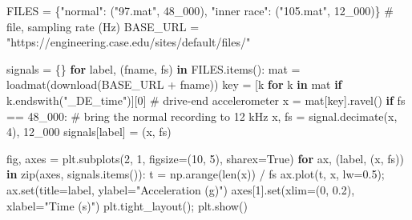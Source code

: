 \documentclass[
  letterpaper,
  DIV=11,
  numbers=noendperiod]{scrreprt}
\newenvironment{Shaded}{\begin{snugshade}}{\end{snugshade}}
\newcommand{\BuiltInTok}[1]{\textcolor[rgb]{0.00,0.23,0.31}{#1}}
\newcommand{\CommentTok}[1]{\textcolor[rgb]{0.37,0.37,0.37}{#1}}
\newcommand{\ControlFlowTok}[1]{\textcolor[rgb]{0.00,0.23,0.31}{\textbf{#1}}}
\newcommand{\DecValTok}[1]{\textcolor[rgb]{0.68,0.00,0.00}{#1}}
\newcommand{\FloatTok}[1]{\textcolor[rgb]{0.68,0.00,0.00}{#1}}
\newcommand{\KeywordTok}[1]{\textcolor[rgb]{0.00,0.23,0.31}{\textbf{#1}}}
\newcommand{\NormalTok}[1]{\textcolor[rgb]{0.00,0.23,0.31}{#1}}
\newcommand{\OperatorTok}[1]{\textcolor[rgb]{0.37,0.37,0.37}{#1}}
\newcommand{\StringTok}[1]{\textcolor[rgb]{0.13,0.47,0.30}{#1}}
\newcommand{\VariableTok}[1]{\textcolor[rgb]{0.07,0.07,0.07}{#1}}
\begin{document}
\begin{Shaded}
\begin{Highlighting}[]
\NormalTok{FILES }\OperatorTok{=}\NormalTok{ \{}\StringTok{"normal"}\NormalTok{: (}\StringTok{"97.mat"}\NormalTok{, }\DecValTok{48\_000}\NormalTok{), }\StringTok{"inner race"}\NormalTok{: (}\StringTok{"105.mat"}\NormalTok{, }\DecValTok{12\_000}\NormalTok{)\}   }\CommentTok{\# file, sampling rate (Hz)}
\NormalTok{BASE\_URL }\OperatorTok{=} \StringTok{"https://engineering.case.edu/sites/default/files/"}

\NormalTok{signals }\OperatorTok{=}\NormalTok{ \{\}}
\ControlFlowTok{for}\NormalTok{ label, (fname, fs) }\KeywordTok{in}\NormalTok{ FILES.items():}
\NormalTok{    mat }\OperatorTok{=}\NormalTok{ loadmat(download(BASE\_URL }\OperatorTok{+}\NormalTok{ fname))}
\NormalTok{    key }\OperatorTok{=}\NormalTok{ [k }\ControlFlowTok{for}\NormalTok{ k }\KeywordTok{in}\NormalTok{ mat }\ControlFlowTok{if}\NormalTok{ k.endswith(}\StringTok{"\_DE\_time"}\NormalTok{)][}\DecValTok{0}\NormalTok{]     }\CommentTok{\# drive{-}end accelerometer}
\NormalTok{    x }\OperatorTok{=}\NormalTok{ mat[key].ravel()}
    \ControlFlowTok{if}\NormalTok{ fs }\OperatorTok{==} \DecValTok{48\_000}\NormalTok{:                                         }\CommentTok{\# bring the normal recording to 12 kHz}
\NormalTok{        x, fs }\OperatorTok{=}\NormalTok{ signal.decimate(x, }\DecValTok{4}\NormalTok{), }\DecValTok{12\_000}
\NormalTok{    signals[label] }\OperatorTok{=}\NormalTok{ (x, fs)}

\NormalTok{fig, axes }\OperatorTok{=}\NormalTok{ plt.subplots(}\DecValTok{2}\NormalTok{, }\DecValTok{1}\NormalTok{, figsize}\OperatorTok{=}\NormalTok{(}\DecValTok{10}\NormalTok{, }\DecValTok{5}\NormalTok{), sharex}\OperatorTok{=}\VariableTok{True}\NormalTok{)}
\ControlFlowTok{for}\NormalTok{ ax, (label, (x, fs)) }\KeywordTok{in} \BuiltInTok{zip}\NormalTok{(axes, signals.items()):}
\NormalTok{    t }\OperatorTok{=}\NormalTok{ np.arange(}\BuiltInTok{len}\NormalTok{(x)) }\OperatorTok{/}\NormalTok{ fs}
\NormalTok{    ax.plot(t, x, lw}\OperatorTok{=}\FloatTok{0.5}\NormalTok{)}\OperatorTok{;}\NormalTok{ ax.}\BuiltInTok{set}\NormalTok{(title}\OperatorTok{=}\NormalTok{label, ylabel}\OperatorTok{=}\StringTok{"Acceleration (g)"}\NormalTok{)}
\NormalTok{axes[}\DecValTok{1}\NormalTok{].}\BuiltInTok{set}\NormalTok{(xlim}\OperatorTok{=}\NormalTok{(}\DecValTok{0}\NormalTok{, }\FloatTok{0.2}\NormalTok{), xlabel}\OperatorTok{=}\StringTok{"Time (s)"}\NormalTok{)}
\NormalTok{plt.tight\_layout()}\OperatorTok{;}\NormalTok{ plt.show()}
\end{Highlighting}
\end{Shaded}
\end{document}
